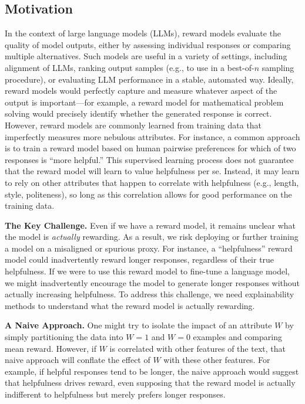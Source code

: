 \subsection{Motivation}
In the context of large language models (LLMs), reward models evaluate the quality of model outputs, either by assessing individual responses or comparing multiple alternatives. Such models are useful in a variety of settings, including alignment of LLMs, ranking output samples (e.g., to use in a best-of-$n$ sampling procedure), or evaluating LLM performance in a stable, automated way.
Ideally, reward models would perfectly capture and measure whatever aspect of the output is important---for example, a reward model for mathematical problem solving would precisely identify whether the generated response is correct. However, reward models are commonly learned from training data that imperfectly measures more nebulous attributes. For instance, a common approach is to train a reward model based on human pairwise preferences for which of two responses is ``more helpful.'' This supervised learning process does not guarantee that the reward model will learn to value helpfulness per se. Instead, it may learn to rely on other attributes that happen to correlate with helpfulness (e.g., length, style, politeness), so long as this correlation allows for good performance on the training data.

\textbf{The Key Challenge.} Even if we have a reward model, it remains unclear what the model is \emph{actually} rewarding. As a result, we risk deploying or further training a model on a misaligned or spurious proxy. For instance, a ``helpfulness'' reward model could inadvertently reward longer responses, regardless of their true helpfulness. If we were to use this reward model to fine-tune a language model, we might inadvertently encourage the model to generate longer responses without actually increasing helpfulness. To address this challenge, we need explainability methods to understand what the reward model is actually rewarding.

\textbf{A Naive Approach.} One might try to isolate the impact of an attribute $W$ by simply partitioning the data into $W=1$ and $W=0$ examples and comparing mean reward. However, if $W$ is correlated with other features of the text, that naive approach will conflate the effect of $W$ with these other features. For example, if helpful responses tend to be longer, the naive approach would suggest that helpfulness drives reward, even supposing that the reward model is actually indifferent to helpfulness but merely prefers longer responses.

